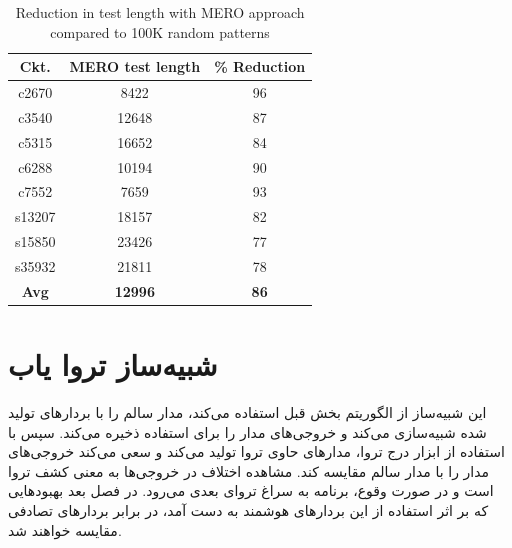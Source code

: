\begin{latin}


\begin{table}[h]
	\centering
	\begin{tabular}{|c|c|c|}
		\hline
		{\bf Ckt.} & \multicolumn{1}{l|}{{\bf MERO test length}} & \multicolumn{1}{l|}{{\bf \% Reduction}} \\ \hline
		c2670      & 8422                                        & 96                                      \\ \hline
		c3540      & 12648                                       & 87                                      \\ \hline
		c5315      & 16652                                       & 84                                      \\ \hline
		c6288      & 10194                                       & 90                                      \\ \hline
		c7552      & 7659                                        & 93                                      \\ \hline
		s13207     & 18157                                       & 82                                      \\ \hline
		s15850     & 23426                                       & 77                                      \\ \hline
		s35932     & 21811                                       & 78                                      \\ \hline
		{\bf Avg}  & {\bf 12996}                                 & {\bf 86}                                \\ \hline
	\end{tabular}
	\caption{Reduction in test length with MERO approach compared to 100K random patterns}
\end{table}
\end{latin}







\section{شبیه‌ساز تروا یاب} 
این شبیه‌ساز از الگوریتم بخش قبل استفاده می‌کند، مدار سالم را با بردارهای تولید شده شبیه‌سازی می‌کند و خروجی‌های مدار را برای استفاده ذخیره می‌کند. سپس با استفاده از ابزار درج تروا، مدارهای حاوی تروا تولید می‌کند و سعی می‌کند خروجی‌های مدار را با مدار سالم مقایسه کند. مشاهده اختلاف در خروجی‌ها به معنی کشف تروا است و در صورت وقوع، برنامه به سراغ تروای بعدی می‌رود. در فصل بعد بهبودهایی که بر اثر استفاده از این بردارهای هوشمند به دست آمد، در برابر بردارهای تصادفی مقایسه خواهند شد.
